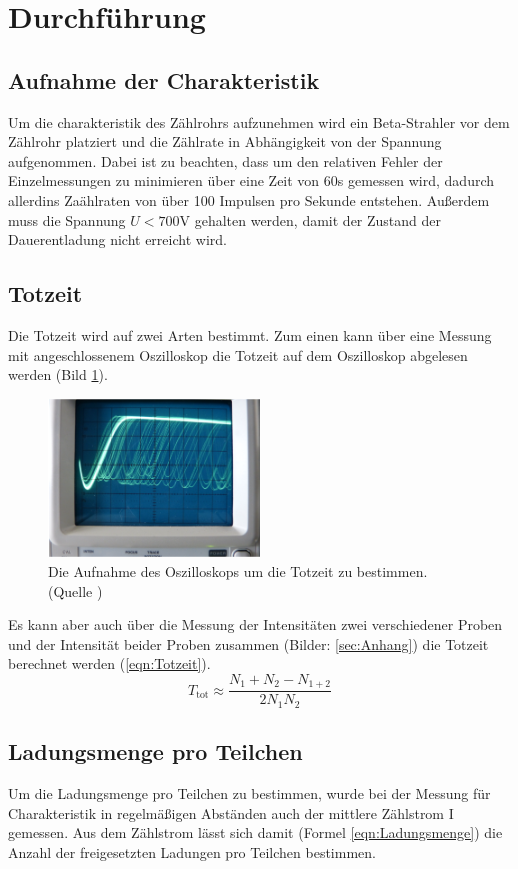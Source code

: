 \section{Durchführung}
\label{sec:Durchfuehrung}
\subsection{Aufnahme der Charakteristik}
Um die charakteristik des Zählrohrs aufzunehmen wird ein Beta-Strahler vor dem Zählrohr platziert und die Zählrate in Abhängigkeit von der Spannung aufgenommen.
Dabei ist zu beachten, dass um den relativen Fehler der Einzelmessungen zu minimieren über eine Zeit von 60s gemessen wird, dadurch allerdins Zaählraten von über 100 Impulsen pro Sekunde entstehen.
Außerdem muss die Spannung $U < 700\text{V}$ gehalten werden, damit der Zustand der Dauerentladung nicht erreicht wird.
\subsection{Totzeit}
Die Totzeit wird auf zwei Arten bestimmt.
Zum einen kann über eine Messung mit angeschlossenem Oszilloskop die Totzeit auf dem Oszilloskop abgelesen werden (Bild \ref{fig:Oszilloskop}).
\begin{figure}
    \centering
    \includegraphics[width=0.5\textwidth]{bilder/Oszilloskop.png}
    \caption{Die Aufnahme des Oszilloskops um die Totzeit zu bestimmen. (Quelle \cite{Anleitung})}
    \label{fig:Oszilloskop}
\end{figure}
Es kann aber auch über die Messung der Intensitäten zwei verschiedener Proben und der Intensität beider Proben zusammen (Bilder: \ref{sec:Anhang}) die Totzeit berechnet werden (\ref{eqn:Totzeit}).
\begin{equation}
    T_{\text{tot}} ≈ \frac{N_{1}+N_{2}-N_{1+2}}{2N_1N_2} \label{eqn:Totzeit}
\end{equation}
\subsection{Ladungsmenge pro Teilchen}
Um die Ladungsmenge pro Teilchen zu bestimmen, wurde bei der Messung für Charakteristik in regelmäßigen Abständen auch der mittlere Zählstrom I gemessen.
Aus dem Zählstrom lässt sich damit (Formel \ref{eqn:Ladungsmenge}) die Anzahl der freigesetzten Ladungen pro Teilchen bestimmen.